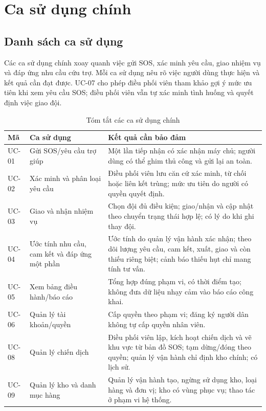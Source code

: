 \documentclass[12pt,a4paper,oneside]{report}
\begin{document}
\section{Ca sử dụng chính}
\subsection{Danh sách ca sử dụng}
Các ca sử dụng chính xoay quanh việc gửi SOS, xác minh yêu cầu, giao nhiệm vụ và đáp ứng nhu cầu cứu trợ. Mỗi ca sử dụng nêu rõ việc người dùng thực hiện và kết quả cần đạt được. UC-07 cho phép điều phối viên tham khảo gợi ý mức ưu tiên khi xem yêu cầu SOS; điều phối viên vẫn tự xác minh tình huống và quyết định việc giao đội.
\begin{table}[htbp]
  \centering
  \caption{Tóm tắt các ca sử dụng chính}\label{tab:use-cases}
  \small
  \begin{tabularx}{\textwidth}{|L{1.6cm}|L{4.0cm}|Y|}
    \hline
    \centering\textbf{Mã} & \centering\textbf{Ca sử dụng} & \centering\arraybackslash\textbf{Kết quả cần bảo đảm} \\
    \hline
    UC-01 & Gửi SOS/yêu cầu trợ giúp & Một lần tiếp nhận có xác nhận máy chủ; người dùng có thể ghim thủ công và gửi lại an toàn. \\
    \hline
    UC-02 & Xác minh và phân loại yêu cầu & Điều phối viên lưu căn cứ xác minh, từ chối hoặc liên kết trùng; mức ưu tiên do người có quyền quyết định. \\
    \hline
    UC-03 & Giao và nhận nhiệm vụ & Chọn đội đủ điều kiện; giao/nhận và cập nhật theo chuyển trạng thái hợp lệ; có lý do khi ghi thay đội. \\
    \hline
    UC-04 & Ước tính nhu cầu, cam kết và đáp ứng một phần & Ước tính do quản lý vận hành xác nhận; theo dõi lượng yêu cầu, cam kết, xuất, giao và còn thiếu riêng biệt; cảnh báo thiếu hụt chỉ mang tính tư vấn. \\
    \hline
    UC-05 & Xem bảng điều hành/báo cáo & Tổng hợp đúng phạm vi, có thời điểm tạo; không đưa dữ liệu nhạy cảm vào báo cáo công khai. \\
    \hline
    UC-06 & Quản lý tài khoản/quyền & Cấp quyền theo phạm vi; đăng ký người dân không tự cấp quyền nhân viên. \\
    \hline
    UC-08 & Quản lý chiến dịch & Điều phối viên lập, kích hoạt chiến dịch và vẽ khu vực từ bản đồ SOS; tạm dừng/đóng theo quyền; quản lý vận hành chỉ định kho chính; có lịch sử. \\
    \hline
    UC-09 & Quản lý kho và danh mục hàng & Quản lý vận hành tạo, ngừng sử dụng kho, loại hàng và đơn vị; kho có vùng phục vụ; thao tác ở phạm vi hệ thống. \\

\end{tabularx}
\end{table}
\end{document}

